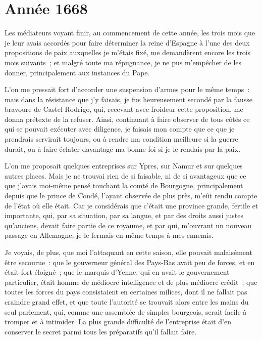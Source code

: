 \documentclass[french,twoside]{book} %
\begin{document}
\section[{Année 1668}]{Année 1668}\renewcommand{\leftmark}{Année 1668}

\noindent Les médiateurs voyant finir, au commencement de cette année, les trois mois que je leur avais accordés pour faire déterminer la reine d’Espagne à l’une des deux propositions de paix auxquelles je m’étais fixé, me demandèrent encore les trois mois suivants ; et malgré toute ma répugnance, je ne pus m’empêcher de les donner, principalement aux instances du Pape.\par
L’on me pressait fort d’accorder une suspension d’armes pour le même temps : mais dans la résistance que j’y faisais, je fus heureusement secondé par la fausse bravoure de Castel Rodrigo, qui, recevant avec froideur cette proposition, me donna prétexte de la refuser. Ainsi, continuant à faire observer de tous côtés ce qui se pouvait exécuter avec diligence, je faisais mon compte que ce que je prendrais servirait toujours, ou à rendre ma condition meilleure si la guerre durait, ou à faire éclater davantage ma bonne foi si je le rendais par la paix.\par
L’on me proposait quelques entreprises sur Ypres, sur Namur et sur quelques autres places. Mais je ne trouvai rien de si faisable, ni de si avantageux que ce que j’avais moi-même pensé touchant la comté de Bourgogne, principalement depuis que le prince de Condé, l’ayant observée de plus près, m’eût rendu compte de l’état où elle était. Car je considérais que c’était une province grande, fertile et importante, qui, par sa situation, par sa langue, et par des droits aussi justes qu’anciens, devait faire partie de ce royaume, et par qui, m’ouvrant un nouveau passage en Allemagne, je le fermais en même temps à mes ennemis.\par
Je voyais, de plus, que moi l’attaquant en cette saison, elle pouvait malaisément être secourue : que le gouverneur général des Pays-Bas avait peu de forces, et en était fort éloigné ; que le marquis d’Yenne, qui en avait le gouvernement particulier, était homme de médiocre intelligence et de plus médiocre crédit ; que toutes les forces du pays consistaient en certaines milices, dont il ne fallait pas craindre grand effet, et que toute l’autorité se trouvait alors entre les mains du seul parlement, qui, comme une assemblée de simples bourgeois, serait facile à tromper et à intimider. La plus grande difficulté de l’entreprise était d’en conserver le secret parmi tous les préparatifs qu’il fallait faire.\par
\end{document}
